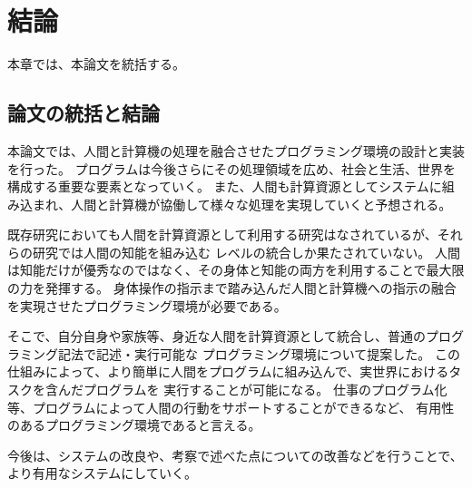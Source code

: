 \chapter{結論}\label{chap:conclusion}

本章では、本論文を統括する。

\section{論文の統括と結論}\label{ux8ad6ux6587ux306eux7d71ux62ecux3068ux7d50ux8ad6}

本論文では、人間と計算機の処理を融合させたプログラミング環境の設計と実装を行った。
プログラムは今後さらにその処理領域を広め、社会と生活、世界を構成する重要な要素となっていく。
また、人間も計算資源としてシステムに組み込まれ、人間と計算機が協働して様々な処理を実現していくと予想される。

既存研究においても人間を計算資源として利用する研究はなされているが、それらの研究では人間の知能を組み込む
レベルの統合しか果たされていない。
人間は知能だけが優秀なのではなく、その身体と知能の両方を利用することで最大限の力を発揮する。
身体操作の指示まで踏み込んだ人間と計算機への指示の融合を実現させたプログラミング環境が必要である。

そこで、自分自身や家族等、身近な人間を計算資源として統合し、普通のプログラミング記法で記述・実行可能な
プログラミング環境について提案した。
この仕組みによって、より簡単に人間をプログラムに組み込んで、実世界におけるタスクを含んだプログラムを
実行することが可能になる。
仕事のプログラム化等、プログラムによって人間の行動をサポートすることができるなど、
有用性のあるプログラミング環境であると言える。

今後は、システムの改良や、考察で述べた点についての改善などを行うことで、
より有用なシステムにしていく。
